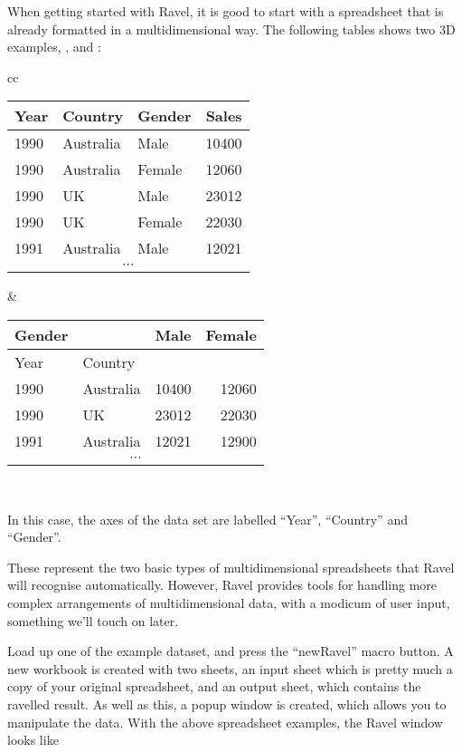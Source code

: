\documentclass{article}
\begin{document}
When getting started with Ravel, it is good to start with a
spreadsheet that is already formatted in a multidimensional way. The
following tables shows two 3D examples, , and :

\begin{tabular}{cc}
\begin{tabular}{|l|l|l|r|}
\hline
Year& Country& Gender& Sales\\\hline
1990& Australia& Male& 10400 \\
1990& Australia& Female & 12060\\
1990& UK & Male & 23012\\
1990& UK & Female& 22030\\
1991 & Australia & Male &12021\\
\multicolumn{4}{|c|}{$\cdots$}\\
\hline
\end{tabular} 
&
\begin{tabular}{|l|l|r|r|}
\hline
Gender & &Male& Female\\\hline
Year& Country& &\\\hline
1990& Australia& 10400 & 12060\\
1990& UK & 23012 & 22030\\
1991 & Australia & 12021 & 12900\\
\multicolumn{4}{|c|}{$\cdots$}\\
\hline
\end{tabular}
\\
\end{tabular}
In this case, the axes of the data set are labelled ``Year'',
``Country'' and ``Gender''.

These represent the two basic types of multidimensional spreadsheets
that Ravel will recognise automatically. However, Ravel provides tools
for handling more complex arrangements of multidimensional data, with
a modicum of user input, something we'll touch on later.

Load up one of the example dataset, and press the ``newRavel'' macro
button. A new workbook is created with two sheets, an input sheet
which is pretty much a copy of your original spreadsheet, and an
output sheet, which contains the ravelled result. As well as this, a
popup window is created, which allows you to manipulate the data. With
the above spreadsheet examples, the Ravel window looks like
\end{document}
